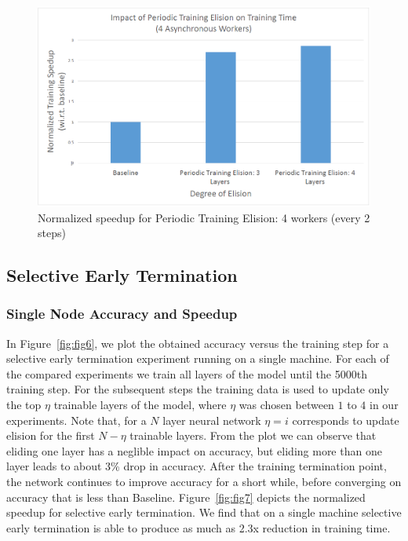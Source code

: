 \begin{figure}[t]
	\centering
	\includegraphics[width=0.8\columnwidth]{figures/fig5.PNG}
	\caption{Normalized speedup for Periodic Training Elision: 4 workers (every 2 steps)}
	\label{fig:fig5}
\end{figure}
\subsection{Selective Early Termination}
\subsubsection{Single Node Accuracy and Speedup} 
In Figure~\ref{fig:fig6}, we plot the obtained accuracy versus the training step for a selective early termination experiment running on a single machine. For each of the compared experiments we train all layers of the model until the 5000th training step. For the subsequent steps the training data is used to update only the top $\eta$ trainable layers of the model, where $\eta$ was chosen between $1$ to $4$ in our experiments. Note that, for a $N$ layer neural network $\eta=i$ corresponds to update elision for the first $N-\eta$ trainable layers. From the plot we can observe that eliding one layer has a neglible impact on accuracy, but eliding more than one layer leads to about 3\% drop in accuracy. After the training termination point, the network continues to improve accuracy for a short while, before converging on accuracy that is less than Baseline. 
Figure~\ref{fig:fig7} depicts the normalized speedup for selective early termination. We find that on a single machine selective early termination is able to produce as much as 2.3x reduction in training time.  

